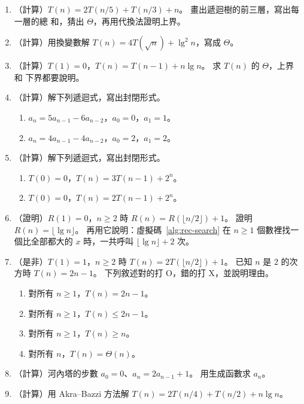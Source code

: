 \begin{enumerate}
\item （計算）$T(n) = 2T(n/5) + T(n/3) + n$。 畫出遞迴樹的前三層，寫出每一層的總
和，猜出 $\Theta$，再用代換法證明上界。

\item （計算）用換變數解 $T(n) = 4T(\sqrt{n}) + \lg^2 n$，寫成 $\Theta$。

\item （計算）$T(1) = 0$，$T(n) = T(n-1) + n \lg n$。 求 $T(n)$ 的 $\Theta$，上界和
下界都要說明。

\item （計算）解下列遞迴式，寫出封閉形式。
\begin{enumerate}
\item $a_n = 5a_{n-1} - 6a_{n-2}$，$a_0 = 0$，$a_1 = 1$。
\item $a_n = 4a_{n-1} - 4a_{n-2}$，$a_0 = 2$，$a_1 = 2$。
\end{enumerate}

\item \label{rec-q-nonhomog}（計算）解下列遞迴式，寫出封閉形式。
\begin{enumerate}
\item $T(0) = 0$，$T(n) = 3T(n-1) + 2^n$。
\item $T(0) = 0$，$T(n) = 2T(n-1) + 2^n$。
\end{enumerate}

\item \label{rec-q-halving}（證明）$R(1) = 0$，$n \ge 2$ 時 $R(n) = R(\lfloor n/2 \rfloor) + 1$。 證明
$R(n) = \lfloor \lg n \rfloor$。 再用它說明：虛擬碼~\ref{alg:rec-search} 在 $n \ge 1$
個數裡找一個比全部都大的 $x$ 時，一共呼叫 $\lfloor \lg n \rfloor + 2$ 次。

\item （是非）$T(1) = 1$，$n \ge 2$ 時 $T(n) = 2T(\lfloor n/2 \rfloor) + 1$。 已知
$n$ 是 $2$ 的次方時 $T(n) = 2n - 1$。 下列敘述對的打 O，錯的打 X，並說明理由。
\begin{enumerate}
\item 對所有 $n \ge 1$，$T(n) = 2n - 1$。
\item 對所有 $n \ge 1$，$T(n) \le 2n - 1$。
\item 對所有 $n \ge 1$，$T(n) \ge n$。
\item 對所有 $n$，$T(n) = \Theta(n)$。
\end{enumerate}

\item （計算）河內塔的步數 $a_0 = 0$、$a_n = 2a_{n-1} + 1$。 用生成函數求 $a_n$。

\item （計算）用 Akra--Bazzi 方法解 $T(n) = 2T(n/4) + T(n/2) + n \lg n$。
\end{enumerate}

